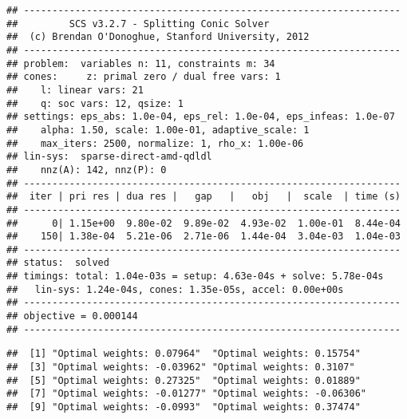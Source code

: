 \documentclass[
]{article}
\newenvironment{Shaded}{\begin{snugshade}}{\end{snugshade}}
\newcommand{\CommentTok}[1]{\textcolor[rgb]{0.56,0.35,0.01}{\textit{#1}}}
\newcommand{\DecValTok}[1]{\textcolor[rgb]{0.00,0.00,0.81}{#1}}
\newcommand{\FunctionTok}[1]{\textcolor[rgb]{0.13,0.29,0.53}{\textbf{#1}}}
\newcommand{\NormalTok}[1]{#1}
\newcommand{\SpecialCharTok}[1]{\textcolor[rgb]{0.81,0.36,0.00}{\textbf{#1}}}
\newcommand{\StringTok}[1]{\textcolor[rgb]{0.31,0.60,0.02}{#1}}
\begin{document}
\begin{verbatim}
## ------------------------------------------------------------------
##         SCS v3.2.7 - Splitting Conic Solver
##  (c) Brendan O'Donoghue, Stanford University, 2012
## ------------------------------------------------------------------
## problem:  variables n: 11, constraints m: 34
## cones:     z: primal zero / dual free vars: 1
##    l: linear vars: 21
##    q: soc vars: 12, qsize: 1
## settings: eps_abs: 1.0e-04, eps_rel: 1.0e-04, eps_infeas: 1.0e-07
##    alpha: 1.50, scale: 1.00e-01, adaptive_scale: 1
##    max_iters: 2500, normalize: 1, rho_x: 1.00e-06
## lin-sys:  sparse-direct-amd-qdldl
##    nnz(A): 142, nnz(P): 0
## ------------------------------------------------------------------
##  iter | pri res | dua res |   gap   |   obj   |  scale  | time (s)
## ------------------------------------------------------------------
##      0| 1.15e+00  9.80e-02  9.89e-02  4.93e-02  1.00e-01  8.44e-04 
##    150| 1.38e-04  5.21e-06  2.71e-06  1.44e-04  3.04e-03  1.04e-03 
## ------------------------------------------------------------------
## status:  solved
## timings: total: 1.04e-03s = setup: 4.63e-04s + solve: 5.78e-04s
##   lin-sys: 1.24e-04s, cones: 1.35e-05s, accel: 0.00e+00s
## ------------------------------------------------------------------
## objective = 0.000144
## ------------------------------------------------------------------
\end{verbatim}

\begin{Shaded}
\end{Shaded}

\begin{verbatim}
##  [1] "Optimal weights: 0.07964"  "Optimal weights: 0.15754" 
##  [3] "Optimal weights: -0.03962" "Optimal weights: 0.3107"  
##  [5] "Optimal weights: 0.27325"  "Optimal weights: 0.01889" 
##  [7] "Optimal weights: -0.01277" "Optimal weights: -0.06306"
##  [9] "Optimal weights: -0.0993"  "Optimal weights: 0.37474"
\end{verbatim}

\begin{Shaded}
\end{Shaded}
\end{document}

